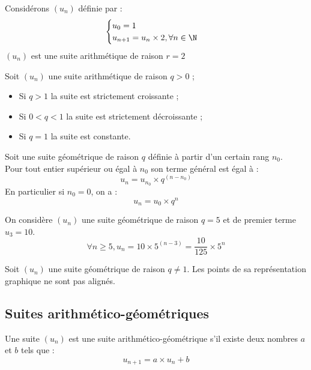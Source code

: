 \documentclass[11pt]{article}
\begin{document}
\begin{exemple}
Considérons $(u_n)$ définie par :
\[ \begin{cases}
u_0 = 1 \\
u_{n+1} = u_n \times 2, \forall n
\in \N
\end{cases} \]
$(u_n)$ est une suite arithmétique de raison $r=2$
\end{exemple}

\begin{propriete}
Soit $(u_n)$ une suite arithmétique de raison $q>0$ ;
\begin{itemize}
\item Si $q > 1$ la suite est strictement croissante ;
\item Si $0 < q < 1$ la suite est strictement décroissante ;
\item Si $q = 1$ la suite est constante.
\end{itemize}
\end{propriete}


\begin{theoreme}
Soit une suite géométrique de raison $q$ définie à partir d'un
certain rang $n_0$.\\
Pour tout entier supérieur ou égal à $n_0$ son terme général est égal à :
\[ u_n = u_{n_0} \times q^{(n-n_0)}\]
En particulier si $n_0=0$, on a : 
\[ u_n = u_0 \times q^n\]
\end{theoreme}

\begin{exemple}
On considère $(u_n)$ une suite géométrique de raison $q=5$ et de
premier terme $u_3=10$.
\[ \forall n \ge 5, u_n=10 \times 5^{(n-3)} = \dfrac{10}{125} \times 5^n\]
\end{exemple}

\begin{propriete}
Soit $(u_n)$ une suite géométrique de raison $q \neq 1$. Les points de
sa représentation graphique ne sont pas alignés.
\end{propriete}


\subsection{Suites  arithmético-géométriques}

\begin{definition}
Une suite $(u_n)$ est une suite arithmético-géométrique s'il existe
deux nombres $a$ et $b$ tels que :
\[ u_{n+1} = a \times u_n + b \]
\end{definition}
\end{document}
